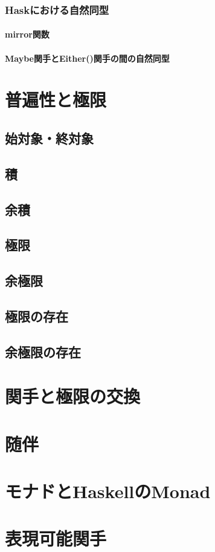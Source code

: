 \documentclass{jsbook}
\theoremstyle{plain}
\begin{document}
\subsection{Haskにおける自然同型}
\subsubsection{mirror関数}
\subsubsection{Maybe関手とEither()関手の間の自然同型}
\chapter{普遍性と極限}
\section{始対象・終対象}
\section{積}
\section{余積}
\section{極限}
\section{余極限}
\section{極限の存在}
\section{余極限の存在}
\chapter{関手と極限の交換}
\chapter{随伴}
\chapter{モナドとHaskellのMonad}
\chapter{表現可能関手}
\printindex
\end{document}
